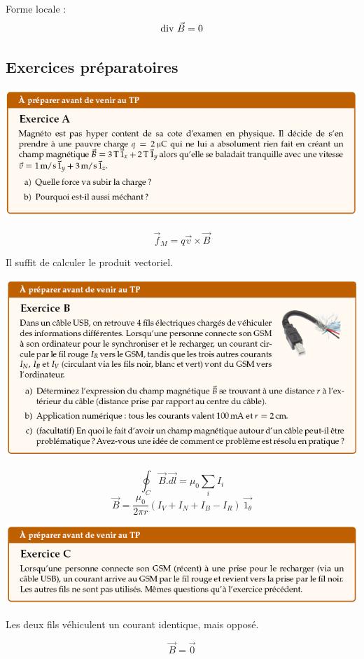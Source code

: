 \documentclass	[11pt, a4paper, openany]{book}
\begin{document}
Forme locale : $$ \divv\,\vec B = 0$$






	\subsection{Exercices préparatoires}
\begin{center}
\includegraphics[scale=0.85]{prepa/magneto1.png}\\
\end{center}
$$\vec{f}_M = q\vec{v} \times \vec{B}$$
\begin{center}
Il suffit de calculer le produit vectoriel.
\end{center}


\begin{center}
\includegraphics[scale=0.85]{prepa/magneto2.png}\\
\end{center}

$$\oint_C \vec{B}.\vec{dl} = \mu_0 \sum_i I_i$$
$$\vec{B} = \frac{\mu_0}{2\pi r}\left(I_V + I_N + I_B - I_R\right)\ \vec{1_\theta}$$




\newpage
\begin{center}
\includegraphics[scale=0.85]{prepa/magneto3.png}\\
\end{center}
\begin{center}
Les deux fils véhiculent un courant identique, mais opposé.
\end{center}
$$\vec{B} = \vec{0}$$
\end{document}
